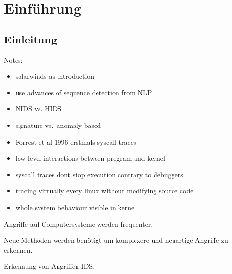 \chapter{Einführung}\label{ch:introduction} %
\section{Einleitung}
Notes:

\begin{itemize}
    \item solarwinds as introduction
    \item use advances of sequence detection from NLP
    \item NIDS vs. HIDS
    \item signature vs.\ anomaly based
    \item Forrest et al 1996 erstmals syscall traces
    \item low level interactions between program and kernel
    \item syscall traces dont stop execution contrary to debuggers
    \item tracing virtually every linux without modifying source code
    \item whole system behaviour visible in kernel
\end{itemize}

Angriffe auf Computersysteme werden frequenter. 

Neue Methoden werden ben\"otigt um komplexere und neuartige Angriffe zu erkennen.

Erkennung von Angriffen \ac{IDS}.

